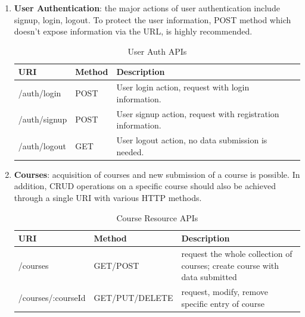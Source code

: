 \begin{enumerate}
\item
\textbf{User Authentication}: the major actions of user authentication include signup, login, logout. To protect the user information, POST method which doesn't expose information via the URL, is highly recommended.

\begin{table}[!htbp]
\centering
\begin{tabularx}{\textwidth}{@{}llX@{}}
\toprule
URI          & Method & Description                                                  \\ \midrule
/auth/login  & POST   & User login action, request with login information.           \\
/auth/signup & POST   & User signup action, request with registration information.   \\
/auth/logout & GET    & User logout action, no data submission is needed.            \\ \bottomrule
\end{tabularx}
\caption{User Auth APIs}
\label{table:user-auth-apis}
\end{table}

\item
\textbf{Courses}: acquisition of courses and new submission of a course is possible. In addition, \gls{CRUD} operations on a specific course should also be achieved through a single URI with various HTTP methods.

\begin{table}[!htbp]
\centering

\begin{tabularx}{\textwidth}{@{}llX@{}}
\toprule
URI                 & Method         & Description                                                                                                          \\ \midrule
/courses            & GET/POST       & request the whole collection of courses; create course with data submitted \\
/courses/:courseId & GET/PUT/DELETE & request, modify, remove specific entry of course                                                                     \\ \bottomrule
\end{tabularx}
\caption{Course Resource APIs}
\label{table:course-resource-apis}
\end{table}


\end{enumerate}
